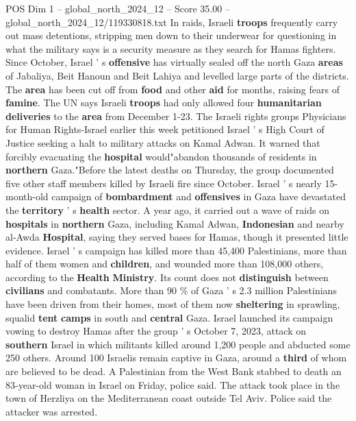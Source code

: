 \begin{textsample}{POS Dim 1 – global\_north\_2024\_12 – Score 35.00 – global\_north\_2024\_12/119330818.txt}
In raids, Israeli \textbf{troops} frequently carry out mass detentions, stripping men down to their underwear for questioning in what the military says is a security measure as they search for Hamas fighters.
Since October, Israel ' s \textbf{offensive} has virtually sealed off the north Gaza \textbf{areas} of Jabaliya, Beit Hanoun and Beit Lahiya and levelled large parts of the districts.
The \textbf{area} has been cut off from \textbf{food} and other \textbf{aid} for months, raising fears of \textbf{famine}.
The UN says Israeli \textbf{troops} had only allowed four \textbf{humanitarian} \textbf{deliveries} to the \textbf{area} from December 1-23.
The Israeli rights groups Physicians for Human Rights-Israel earlier this week petitioned Israel ' s High Court of Justice seeking a halt to military attacks on Kamal Adwan.
It warned that forcibly evacuating the \textbf{hospital} would"abandon thousands of residents in \textbf{northern} Gaza."Before the latest deaths on Thursday, the group documented five other staff members killed by Israeli fire since October.
Israel ' s nearly 15-month-old campaign of \textbf{bombardment} and \textbf{offensives} in Gaza have devastated the \textbf{territory} ' s \textbf{health} sector.
A year ago, it carried out a wave of raids on \textbf{hospitals} in \textbf{northern} Gaza, including Kamal Adwan, \textbf{Indonesian} and nearby al-Awda \textbf{Hospital}, saying they served bases for Hamas, though it presented little evidence.
Israel ' s campaign has killed more than 45,400 Palestinians, more than half of them women and \textbf{children}, and wounded more than 108,000 others, according to the \textbf{Health} \textbf{Ministry}.
Its count does not \textbf{distinguish} between \textbf{civilians} and combatants.
More than 90 \% of Gaza ' s 2.3 million Palestinians have been driven from their homes, most of them now \textbf{sheltering} in sprawling, squalid \textbf{tent} \textbf{camps} in south and \textbf{central} Gaza.
Israel launched its campaign vowing to destroy Hamas after the group ' s October 7, 2023, attack on \textbf{southern} Israel in which militants killed around 1,200 people and abducted some 250 others.
Around 100 Israelis remain captive in Gaza, around a \textbf{third} of whom are believed to be dead.
A Palestinian from the West Bank stabbed to death an 83-year-old woman in Israel on Friday, police said.
The attack took place in the town of Herzliya on the Mediterranean coast outside Tel Aviv.
Police said the attacker was arrested.

\end{textsample}
